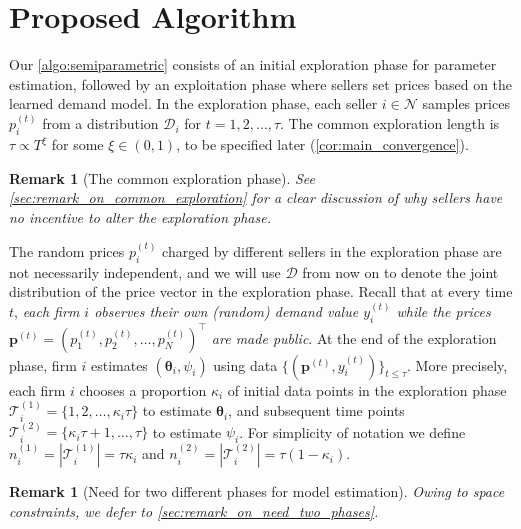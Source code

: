 \documentclass{article} %
\newtheorem{remark}[theorem]{Remark}
\begin{document}
\section{Proposed Algorithm}
Our \cref{algo:semiparametric} consists of an initial exploration phase for parameter estimation, followed by an exploitation phase where sellers set prices based on the learned demand model. In the exploration phase, each seller $i \in \mathcal{N}$ samples prices $p_i^{(t)}$ from a distribution $\mathscr{D}_i$ for $t=1,2,\dots,\tau$. The common exploration length is $\tau \propto T^\xi$ for some $\xi \in (0,1)$, to be specified later (\cref{cor:main_convergence}).
\begin{remark}[The common exploration phase]\label{remark:common_exploration}
See \cref{sec:remark_on_common_exploration} for a clear discussion of why sellers have no incentive to alter the exploration phase.
\end{remark}
The random prices $p_i^{(t)}$ charged by different sellers in the exploration phase are not necessarily independent, and we will use $\mathscr{D}$ from now on to denote the joint distribution of the price vector in the exploration phase. Recall that at every time $t$, \emph{each firm $i$ observes their own (random) demand value $y_i^{(t)}$ while the prices $\mathbf{p}^{(t)}=(p_1^{(t)},p_2^{(t)},\dots,p_N^{(t)})^\top$ are made public}. At the end of the exploration phase, firm $i$ estimates $(\boldsymbol{\theta}_i,\psi_i)$ using data $\{(\mathbf{p}^{(t)},y_i^{(t)})\}_{t\leq \tau}$. More precisely, each firm $i$ chooses a proportion $\kappa_i$ of initial data points in the exploration phase $\mathcal{T}_i^{(1)}=\{1,2,\dots, \kappa_i \tau\}$ to estimate $\boldsymbol{\theta}_i$, and subsequent time points $\mathcal{T}^{(2)}_i=\{\kappa_i \tau +1, \dots, \tau\}$ to estimate $\psi_i$. For simplicity of notation we define $n_i^{(1)} = |\mathcal{T}_i^{(1)}| =  \tau\kappa_i$ and $n_i^{(2)} = |\mathcal{T}_i^{(2)}| =  \tau(1-\kappa_i)$. 
\begin{remark}[Need for two different phases for model estimation]\label{remark:Need of two different phases}
Owing to space constraints, we defer to \cref{sec:remark_on_need_two_phases}.
\end{remark}
\end{document}
